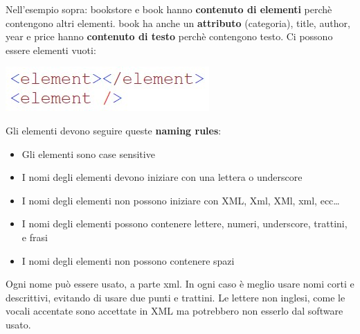 Nell'esempio sopra: bookstore e book hanno \textbf{contenuto di elementi} perchè contengono altri elementi. book ha anche un \textbf{attributo} (categoria), title, author, year e price hanno \textbf{contenuto di testo} perchè contengono testo. 
Ci possono essere elementi vuoti:
\begin{center}
    \includegraphics[scale=0.4]{Images/TecnologieWeb/5/Element.jpg}
\end{center}

Gli elementi devono seguire queste \textbf{naming rules}:
\begin{itemize}
    \item Gli elementi sono case sensitive
    \item I nomi degli elementi devono iniziare con una lettera o underscore
    \item I nomi degli elementi non possono iniziare con XML, Xml, XMl, xml, ecc\dots
    \item I nomi degli elementi possono contenere lettere, numeri, underscore, trattini, e frasi
    \item I nomi degli elementi non possono contenere spazi
\end{itemize}

Ogni nome può essere usato, a parte xml. In ogni caso è meglio usare nomi corti e descrittivi, evitando di usare due punti e trattini. Le lettere non inglesi, come le vocali accentate sono accettate in XML ma potrebbero non esserlo dal software usato. 

